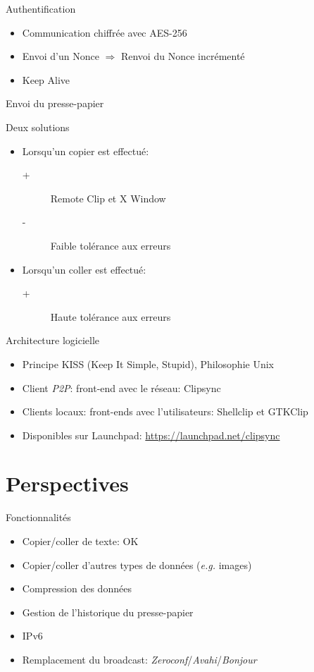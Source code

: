 \documentclass{beamer}
\begin{document}
\begin{frame}{Authentification}
  \begin{itemize}
  \item Communication chiffrée avec AES-256
  \item Envoi d'un Nonce $\Rightarrow$ Renvoi du Nonce incrémenté
  \item Keep Alive
  \end{itemize}
\end{frame}

\begin{frame}{Envoi du presse-papier}
  \begin{block}{Deux solutions}
    \begin{itemize}
    \item Lorsqu'un copier est effectué:
      \begin{description}
      \item[+] Remote Clip et X Window
      \item[-] Faible tolérance aux erreurs
      \end{description}
    \item Lorsqu'un coller est effectué:
      \begin{description}
      \item[+] Haute tolérance aux erreurs
      \end{description}
    \end{itemize}
  \end{block}
\end{frame}

\begin{frame}{Architecture logicielle}
  \begin{itemize}
  \item Principe KISS (Keep It Simple, Stupid), Philosophie Unix
  \item Client \emph{P2P}: front-end avec le réseau: Clipsync
  \item Clients locaux: front-ends avec l'utilisateurs: Shellclip et GTKClip
  \item Disponibles sur Launchpad: \url{https://launchpad.net/clipsync}
  \end{itemize}
\end{frame}

\section{Perspectives}
\begin{frame}{Fonctionnalités}
  \begin{itemize}
  \item Copier/coller de texte: OK
  \item Copier/coller d'autres types de données (\emph{e.g.} images)
  \item Compression des données
  \item Gestion de l'historique du presse-papier
  \item IPv6
  \item Remplacement du broadcast: \emph{Zeroconf}/\emph{Avahi}/\emph{Bonjour}
  \end{itemize}
\end{frame}
\end{document}
